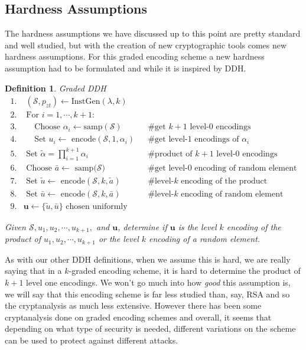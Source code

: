 \documentclass[12pt,twoside]{reedthesis}
\newtheorem{definition}{Definition}
\begin{document}
    \subsection{Hardness Assumptions}
    
    The hardness assumptions we have discussed up to this point are pretty standard and well studied, but with the creation of new cryptographic tools comes new hardness assumptions. For this graded encoding scheme a new hardness assumption had to be formulated and while it is inspired by DDH.
        
    \begin{definition}{Graded DDH}
    \begin{align*}
    1. &\; (\mathcal{S},p_{zt}) \leftarrow \text{InstGen}(\lambda,k) && \\
    2. & \text{ For } i = 1,\cdots,k+1: && \\
    3. &\quad \text{ Choose } \alpha_i \leftarrow \text{samp}(\mathcal{S}) && \text{\# get $k+1$ level-0 encodings} \\
    4. &\quad \text{ Set $u_i \leftarrow$ encode$(\mathcal{S},1,\alpha_i)$} &&\text{\# get level-1 encodings of $\alpha_i$} \\
    5. & \text{ Set $\tilde{\alpha} = \prod_{i=1}^{k+1}$}\alpha_i &&\text{\# product of $k+1$ level-0 encodings} \\
    6. & \text{ Choose $\bar{a} \leftarrow$ samp($\mathcal{S}$)} &&\text{\# get level-0 encoding of random element} \\
    7. & \text{ Set $\tilde{u} \leftarrow$ encode$(\mathcal{S},k,\tilde{a})$} &&\text{\# level-$k$ encoding of the product} \\
    8. & \text{ Set $\bar{u}\leftarrow$ encode$(\mathcal{S},k,\bar{a})$} &&\text{\# level-$k$ encoding of random element} \\
    9. & \boldsymbol{u} \leftarrow \{\tilde{u},\bar{u} \} \text{ chosen uniformly} &&
    \end{align*}
    \par Given $\mathcal{S},u_1,u_2,\cdots,u_{k+1},$ and $\boldsymbol{u}$, determine if $\boldsymbol{u}$ is the level $k$ encoding of the product of $u_1,u_2,\cdots, u_{k+1}$ or the level $k$ encoding of a random element.
    \end{definition}
    
    As with our other DDH definitions, when we assume this is hard, we are really saying that in a $k$-graded encoding scheme, it is hard to determine the product of $k+1$ level one encodings. We won't go much into how \textit{good} this assumption is, we will say that this encoding scheme is far less studied than, say, RSA and so the cryptanalysis as much less extensive. However there has been some cryptanalysis done on graded encoding schemes and overall, it seems that depending on what type of security is needed, different variations on the scheme can be used to protect against different attacks.     
    
\end{document}
